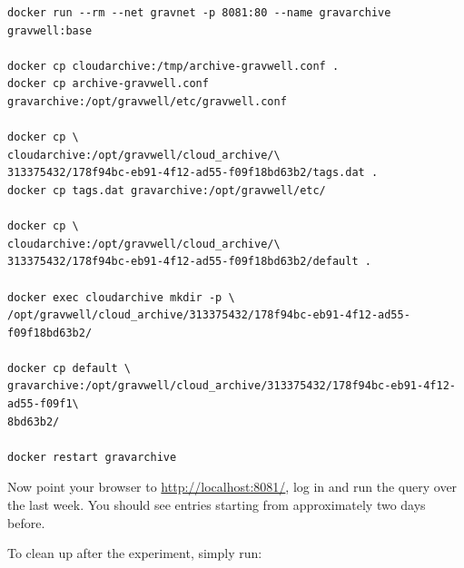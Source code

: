 \begin{Verbatim}[breaklines=true]
docker run --rm --net gravnet -p 8081:80 --name gravarchive gravwell:base

docker cp cloudarchive:/tmp/archive-gravwell.conf .
docker cp archive-gravwell.conf gravarchive:/opt/gravwell/etc/gravwell.conf

docker cp \
cloudarchive:/opt/gravwell/cloud_archive/\
313375432/178f94bc-eb91-4f12-ad55-f09f18bd63b2/tags.dat .
docker cp tags.dat gravarchive:/opt/gravwell/etc/

docker cp \ 
cloudarchive:/opt/gravwell/cloud_archive/\
313375432/178f94bc-eb91-4f12-ad55-f09f18bd63b2/default .

docker exec cloudarchive mkdir -p \
/opt/gravwell/cloud_archive/313375432/178f94bc-eb91-4f12-ad55-f09f18bd63b2/

docker cp default \
gravarchive:/opt/gravwell/cloud_archive/313375432/178f94bc-eb91-4f12-ad55-f09f1\
8bd63b2/

docker restart gravarchive
\end{Verbatim}

Now point your browser to
\href{http://localhost:8081/}{http://localhost:8081/}, log in and run the query
 over the last week. You should see entries starting from
approximately two days before.

To clean up after the experiment, simply run:

